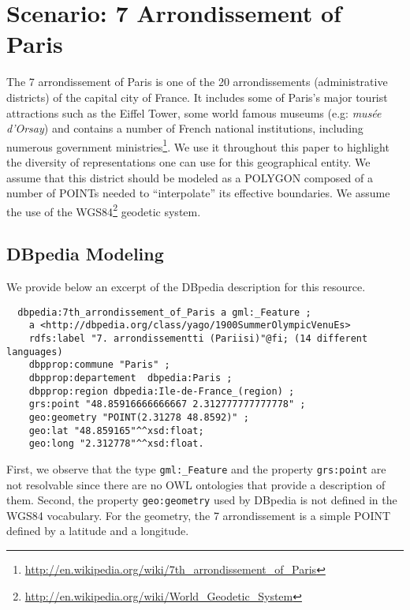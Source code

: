 \section{Scenario: 7 Arrondissement of Paris}                      \label{sec:scenario}

The 7 arrondissement of Paris is one of the 20 arrondissements (administrative districts) of the capital city of France. It includes some of Paris's major tourist attractions such as the Eiffel Tower, some world famous museums (e.g: \textit{musée d'Orsay}) and contains a number of French national institutions, including numerous government ministries\footnote{\url{http://en.wikipedia.org/wiki/7th_arrondissement_of_Paris}}. We use it throughout this paper to highlight the diversity of representations one can use for this geographical entity. We assume that this district should be modeled as a POLYGON composed of a number of POINTs needed to ``interpolate'' its effective boundaries. We assume the use of the WGS84\footnote{\url{http://en.wikipedia.org/wiki/World_Geodetic_System}} geodetic system.

\subsection{DBpedia Modeling}
We provide below an excerpt of the DBpedia description for this resource.
{\scriptsize
\begin{verbatim}
  dbpedia:7th_arrondissement_of_Paris a gml:_Feature ;
    a <http://dbpedia.org/class/yago/1900SummerOlympicVenuEs>
    rdfs:label "7. arrondissementti (Pariisi)"@fi; (14 different languages)
    dbpprop:commune "Paris" ;
    dbpprop:departement  dbpedia:Paris ;
    dbpprop:region dbpedia:Ile-de-France_(region) ;
    grs:point "48.85916666666667 2.312777777777778" ;
    geo:geometry "POINT(2.31278 48.8592)" ;
    geo:lat "48.859165"^^xsd:float;
    geo:long "2.312778"^^xsd:float.
\end{verbatim}
}
First, we observe that the type \texttt{gml:\_Feature} and the property \texttt{grs:point} are not resolvable since there are no OWL ontologies that provide a description of them. Second, the property \texttt{geo:geometry} used by DBpedia is not defined in the WGS84 vocabulary. For the geometry, the 7 arrondissement is a simple POINT defined by a latitude and a longitude.

